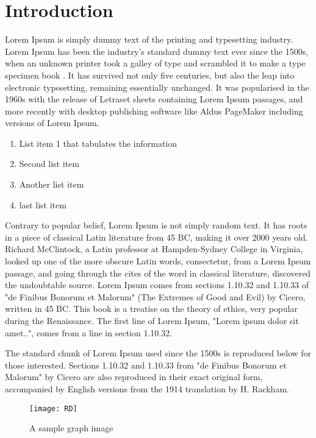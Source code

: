 \chapter{Introduction}

Lorem Ipsum is simply dummy text of the printing and typesetting industry. Lorem Ipsum has been the industry's standard dummy text ever since the 1500s, when an unknown printer took a galley of type and scrambled it to make a type specimen book \cite{gridftp}. It has survived not only five centuries, but also the leap into electronic typesetting, remaining essentially unchanged. It was popularised in the 1960s with the release of Letraset sheets containing Lorem Ipsum passages, and more recently with desktop publishing software like Aldus PageMaker including versions of Lorem Ipsum.
\begin{enumerate}
  \item
  List item 1 that tabulates the information
  \item
  Second list item
  \item
  Another list item
  \item
  last list item
\end{enumerate}

Contrary to popular belief, Lorem Ipsum is not simply random text. It has roots in a piece of classical Latin literature from 45 BC, making it over 2000 years old. Richard McClintock, a Latin professor at Hampden-Sydney College in Virginia, looked up one of the more obscure Latin words, consectetur, from a Lorem Ipsum passage, and going through the cites of the word in classical literature, discovered the undoubtable source. Lorem Ipsum comes from sections 1.10.32 and 1.10.33 of "de Finibus Bonorum et Malorum" (The Extremes of Good and Evil) by Cicero, written in 45 BC. This book is a treatise on the theory of ethics, very popular during the Renaissance. The first line of Lorem Ipsum, "Lorem ipsum dolor sit amet..", comes from a line in section 1.10.32.

The standard chunk of Lorem Ipsum used since the 1500s is reproduced below for those interested. Sections 1.10.32 and 1.10.33 from "de Finibus Bonorum et Malorum" by Cicero are also reproduced in their exact original form, accompanied by English versions from the 1914 translation by H. Rackham.

\begin{figure}[ht]
  \begin{center}
    \texttt{[image: RD]}
    \caption{A sample graph image}
  \end{center}
\end{figure}

